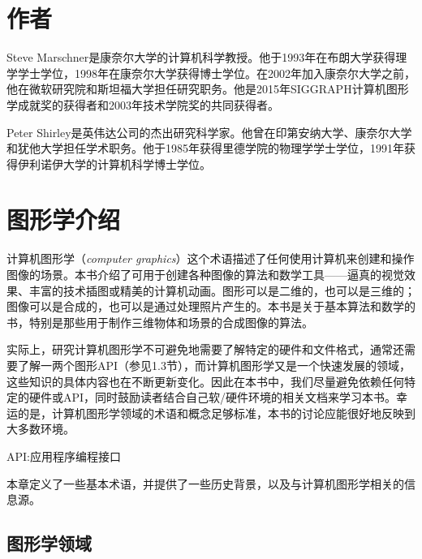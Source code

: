 \documentclass[lang=cn,12pt]{elegantbook}
\begin{document}



\vspace*{-1em}

\chapter{作者}

Steve Marschner是康奈尔大学的计算机科学教授。他于1993年在布朗大学获得理学学士学位，1998年在康奈尔大学获得博士学位。在2002年加入康奈尔大学之前，他在微软研究院和斯坦福大学担任研究职务。他是2015年SIGGRAPH计算机图形学成就奖的获得者和2003年技术学院奖的共同获得者。

Peter Shirley是英伟达公司的杰出研究科学家。他曾在印第安纳大学、康奈尔大学和犹他大学担任学术职务。他于1985年获得里德学院的物理学学士学位，1991年获得伊利诺伊大学的计算机科学博士学位。

\tableofcontents

\mainmatter

\chapter{图形学介绍}

计算机图形学（\textit{computer graphics}）这个术语描述了任何使用计算机来创建和操作图像的场景。本书介绍了可用于创建各种图像的算法和数学工具——逼真的视觉效果、丰富的技术插图或精美的计算机动画。图形可以是二维的，也可以是三维的；图像可以是合成的，也可以是通过处理照片产生的。本书是关于基本算法和数学的书，特别是那些用于制作三维物体和场景的合成图像的算法。

实际上，研究计算机图形学不可避免地需要了解特定的硬件和文件格式，通常还需要了解一两个图形API（参见1.3节），而计算机图形学又是一个快速发展的领域，这些知识的具体内容也在不断更新变化。因此在本书中，我们尽量避免依赖任何特定的硬件或API，同时鼓励读者结合自己软/硬件环境的相关文档来学习本书。幸运的是，计算机图形学领域的术语和概念足够标准，本书的讨论应能很好地反映到大多数环境。

\begin{note}
API:应用程序编程接口
\end{note}

本章定义了一些基本术语，并提供了一些历史背景，以及与计算机图形学相关的信息源。

\section{图形学领域}
\end{document}
